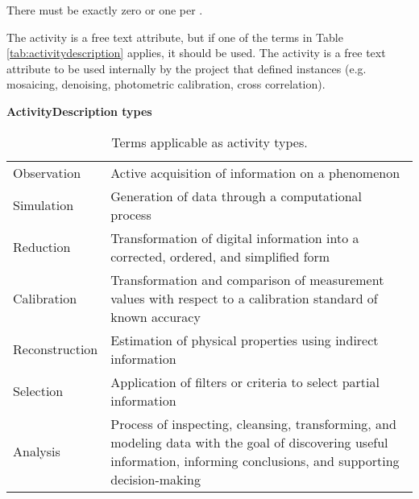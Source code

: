 There must be exactly zero or one  per . 

The activity  is a free text attribute, but if one of the terms in Table \ref{tab:activitydescription} applies, it should be used.
The activity  is a free text attribute to be used internally by the project that defined  instances (e.g. mosaicing, denoising, photometric calibration, cross correlation).




\begin{table}[ht]
\small
{}\textwidth
\textbf{\normalsize ActivityDescription types}\vspace{0.25em}\\
\begin{tabulary}{1.0\textwidth}{lL}
\toprule
{} &  \\
\midrule
Observation    & Active acquisition of information on a phenomenon\\
Simulation     & Generation of data through a computational process\\
Reduction      & Transformation of digital information into a corrected, ordered, and simplified form\\
Calibration    & Transformation and comparison of measurement values with respect to a calibration standard of known accuracy\\
Reconstruction & Estimation of physical properties using indirect information\\
Selection      & Application of filters or criteria to select partial information\\
Analysis       & Process of inspecting, cleansing, transforming, and modeling data with the goal of discovering useful information, informing conclusions, and supporting decision-making\\
\bottomrule
\end{tabulary}
\caption[Terms applicable as activity types.]{Terms applicable as activity types.}
\label{tab:activitydescription-roles}
\end{table}




